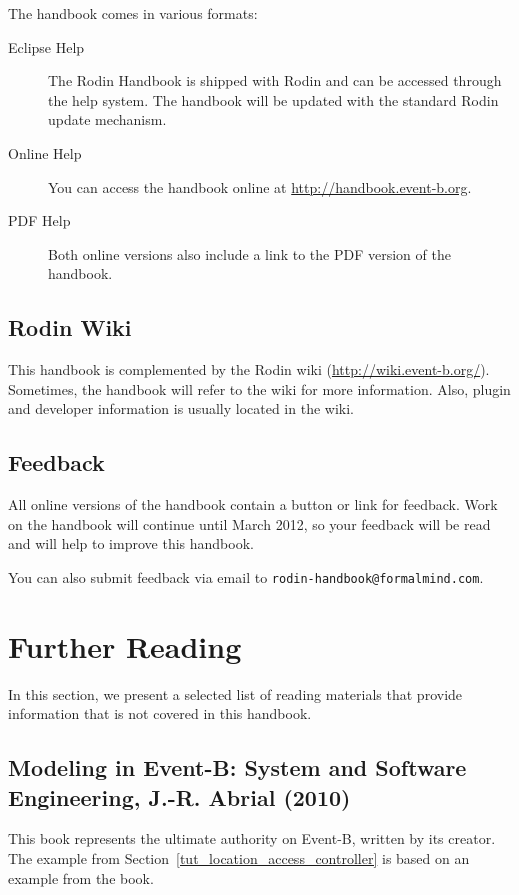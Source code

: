 \documentclass[12pt]{book}
\begin{document}
The handbook comes in various formats:

\begin{description}
	\item[Eclipse Help] The Rodin Handbook is shipped with Rodin and can be accessed through the help system.  The handbook will be updated with the standard Rodin update mechanism.
	\item[Online Help] You can access the handbook online at \url{http://handbook.event-b.org}.
	\item[PDF Help] Both online versions also include a link to the PDF version of the handbook.
\end{description}

\subsection{Rodin Wiki}
\label{rodin_wiki}

This handbook is complemented by the Rodin wiki (\url{http://wiki.event-b.org/}).  Sometimes, the handbook will refer to the wiki for more information.  Also, plugin and developer information is usually located in the wiki.

\subsection{Feedback}
\label{feedback}

All online versions of the handbook contain a button or link for feedback.  Work on the handbook will continue until March 2012, so your feedback will be read and will help to improve this handbook.

You can also submit feedback via email to \texttt{rodin-hand\-book@formal\-mind.com}.

\section{Further Reading}
\label{literature}

In this section, we present a selected list of reading materials that provide information that is not covered in this handbook.

\subsection{Modeling in Event-B: System and Software Engineering, J.-R. Abrial (2010)}
\label{abrial_2010}

This book represents the ultimate authority on Event-B, written by its creator.  The example from Section~\ref{tut_location_access_controller} is based on an example from the book.
\end{document}
